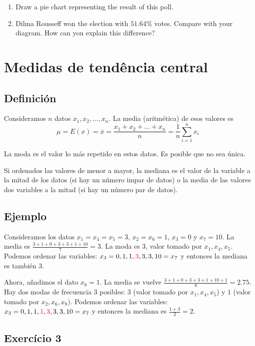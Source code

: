 \begin{enumerate}
\item Draw a pie chart representing the result of this poll.
\item Dilma Rousseff won the election with $51.64\%$ votes. Compare
  with your diagram. How can you explain this difference?
\end{enumerate}

\section{Medidas de tendência central}

\subsection*{Definición}

Consideramos $n$ datos $x_1, x_2, \ldots, x_n$. La media (aritmética) de esos
valores es
$$\mu = E(x) =
\overline{x} = \frac{x_1 + x_2 + \ldots + x_n}{n} = \frac{1}{n}\sum_{i=1}^n x_i$$

La moda es el valor lo más repetido en estos datos. Es posible que no sea
única.

Si ordenados las valores
de menor a mayor, la mediana es el valor de la variable a la mitad de los datos
(si hay un número impar de datos)
o la media de las valores dos variables a la mitad (si hay un número par de
datos).

\subsection*{Ejemplo}

Consideramos los datos $x_1 = x_4 = x_5 = 3$, $x_2 = x_6 = 1$,
$x_3 = 0$ y $x_7 = 10$. La media es $\frac{3+1+0+3+3+1+10}{7} = 3$. La moda
es $3$, valor tomado por $x_1, x_4, x_5$. Podemos ordenar las variables:
$x_3 = 0, 1, 1, {\color{red}3}, 3, 3, 10 = x_7$ y entonces la mediana es también $3$.

Ahora, añadimos el dato $x_8 = 1$. La media se vuelve
$\frac{3+1+0+3+3+1+10+1}{8} = 2.75$. Hay dos modas de frecuencia $3$ posibles:
$3$ (valor tomado por $x_1, x_4, x_5$) y
$1$ (valor tomado por $x_2, x_6, x_8$). Podemos ordenar las variables:
$x_3 = 0, 1, 1, {\color{red} 1}, {\color{red} 3}, 3, 3, 10 = x_7$ y entonces
la mediana es $\frac{1+3}{2} = 2$.

\subsection*{Exercício 3}

